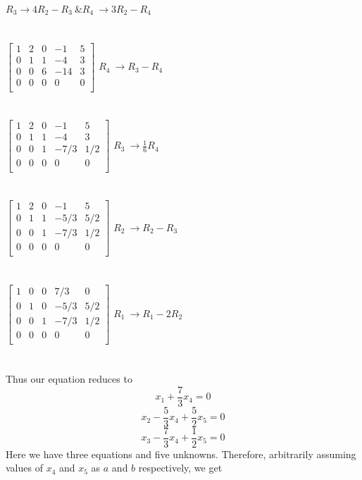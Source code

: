 \documentclass[12pt]{article}
\newcommand\tab[1][1cm]{\hspace*{#1}}
\begin{document}
\textnormal{$R_3 \rightarrow 4R_2-R_3 \ \& R_4 \  \rightarrow 3R_2 - R_4$\\}
\\ \\
 $\left[ \begin{array}{ccccc}
  1 & 2 & 0 & -1 & 5\\
  0 & 1 & 1 & -4 & 3\\
  0 & 0 & 6 & -14 & 3\\
  0 & 0 & 0 & 0 & 0\\
  \end{array} \right]$
\textnormal{$R_4 \  \rightarrow R_3 - R_4$\\}
\\ \\
 $\left[ \begin{array}{ccccc}
  1 & 2 & 0 & -1 & 5\\
  0 & 1 & 1 & -4 & 3\\
  0 & 0 & 1 & -7/3 & 1/2\\
  0 & 0 & 0 & 0 & 0\\
  \end{array} \right]$
\textnormal{$R_3 \  \rightarrow \frac{1}{6}R_4$\\}
\\ \\
 $\left[ \begin{array}{ccccc}
  1 & 2 & 0 & -1 & 5\\
  0 & 1 & 1 & -5/3 & 5/2\\
  0 & 0 & 1 & -7/3 & 1/2\\
  0 & 0 & 0 & 0 & 0\\
  \end{array} \right]$
\textnormal{$R_2 \  \rightarrow R_2 - R_3$\\}
\\ \\
 $\left[ \begin{array}{ccccc}
  1 & 0 & 0 & 7/3 & 0\\
  0 & 1 & 0 & -5/3 & 5/2\\
  0 & 0 & 1 & -7/3 & 1/2\\
  0 & 0 & 0 & 0 & 0\\
  \end{array} \right]$
\textnormal{$R_1 \  \rightarrow R_1 - 2R_2$\\}
\\ \\
\noindent \tab Thus our equation reduces to \\
$$x_1 + \frac{7}{3}x_4 = 0 $$
$$x_2- \frac{5}{3}x_4 + \frac{5}{2}x_5 = 0 $$
$$x_3 - \frac{7}{3}x_4 + \frac{1}{2}x_5 = 0$$
\noindent \tab Here we have three equations and five unknowns. Therefore, arbitrarily assuming values of $x_4$ and $x_5$ as $a$ and $b$ respectively, we get\\
\end{document}
